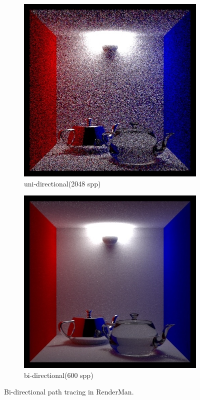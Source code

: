 \begin{figure}\label{f:f:bid-tracing-show}
	\begin{subfigure}[b]{0.48\textwidth}
		\includegraphics[width=1.0\textwidth]{graphics/gi/path-8-1}
		\caption{uni-directional(2048 spp)}
	\end{subfigure}
	\begin{subfigure}[b]{0.48\textwidth}
		\includegraphics[width=1.0\textwidth]{graphics/gi/path-8-2}
		\caption{bi-directional(600 spp)}
	\end{subfigure}
	\caption{Bi-directional path tracing in RenderMan.}
\end{figure}

